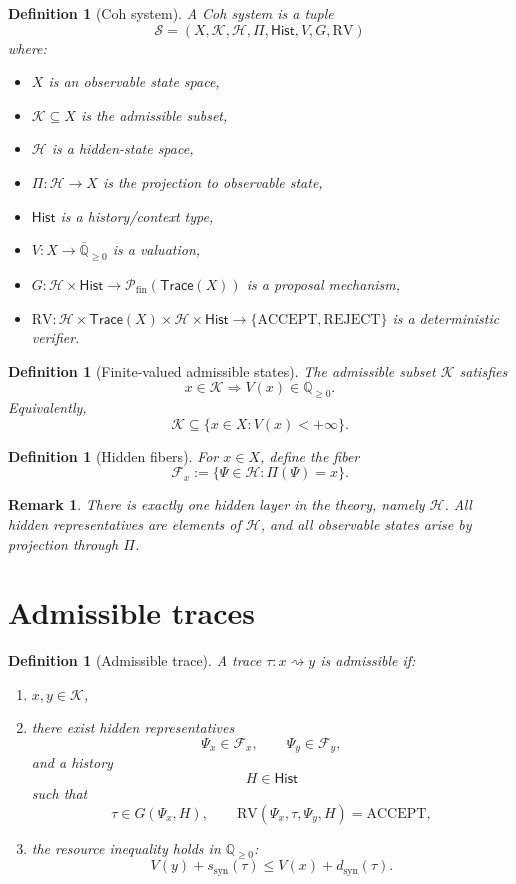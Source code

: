 \documentclass[11pt]{article}
\newtheorem{definition}[theorem]{Definition}
\newtheorem{remark}[theorem]{Remark}
\newcommand{\ACCEPT}{\mathrm{ACCEPT}}
\newcommand{\REJECT}{\mathrm{REJECT}}
\newcommand{\RV}{\mathrm{RV}}
\newcommand{\syn}{\mathrm{syn}}
\newcommand{\Qbar}{\overline{\mathbb Q}_{\ge 0}}
\newcommand{\Kadm}{\mathcal{K}}
\newcommand{\Hid}{\mathcal{H}}
\newcommand{\F}{\mathcal{F}}
\newcommand{\Trace}{\mathsf{Trace}}
\newcommand{\Hist}{\mathsf{Hist}}
\newcommand{\Pfin}{\mathcal{P}_{\mathrm{fin}}}
\begin{document}
\begin{definition}[Coh system]
A Coh system is a tuple
\[
\mathcal S=(X,\Kadm,\Hid,\Pi,\Hist,V,G,\RV)
\]
where:
\begin{itemize}[leftmargin=2em]
\item $X$ is an observable state space,
\item $\Kadm\subseteq X$ is the admissible subset,
\item $\Hid$ is a hidden-state space,
\item $\Pi:\Hid\to X$ is the projection to observable state,
\item $\Hist$ is a history/context type,
\item $V:X\to \Qbar$ is a valuation,
\item $G:\Hid\times \Hist\to \Pfin(\Trace(X))$ is a proposal mechanism,
\item $\RV:\Hid\times \Trace(X)\times \Hid\times \Hist\to\{\ACCEPT,\REJECT\}$ is a deterministic verifier.
\end{itemize}
\end{definition}

\begin{definition}[Finite-valued admissible states]
The admissible subset $\Kadm$ satisfies
\[
x\in \Kadm \Longrightarrow V(x)\in \mathbb Q_{\ge 0}.
\]
Equivalently,
\[
\Kadm \subseteq \{x\in X: V(x)<+\infty\}.
\]
\end{definition}

\begin{definition}[Hidden fibers]
For $x\in X$, define the fiber
\[
\F_x:=\{\Psi\in\Hid:\Pi(\Psi)=x\}.
\]
\end{definition}

\begin{remark}
There is exactly one hidden layer in the theory, namely $\Hid$. All hidden representatives are elements of $\Hid$, and all observable states arise by projection through $\Pi$.
\end{remark}

\section{Admissible traces}

\begin{definition}[Admissible trace]
A trace $\tau:x\rightsquigarrow y$ is \emph{admissible} if:
\begin{enumerate}[label=(\roman*),leftmargin=2em]
\item $x,y\in\Kadm$,
\item there exist hidden representatives
\[
\Psi_x\in\F_x,\qquad \Psi_y\in\F_y,
\]
and a history
\[
H\in\Hist
\]
such that
\[
\tau\in G(\Psi_x,H),
\qquad
\RV(\Psi_x,\tau,\Psi_y,H)=\ACCEPT,
\]
\item the resource inequality holds in $\mathbb Q_{\ge 0}$:
\[
V(y)+s_{\syn}(\tau)\le V(x)+d_{\syn}(\tau).
\]
\end{enumerate}
\end{definition}
\end{document}
